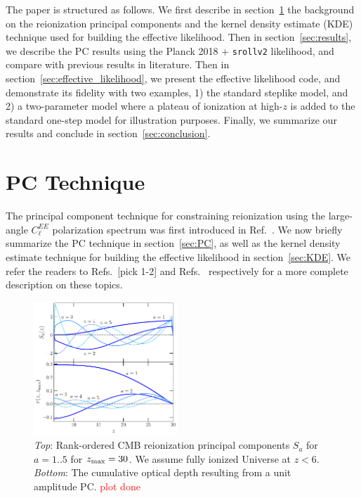 \documentclass[prd,twocolumn,amsmath,amssymb,floatfix,superscriptaddress,nofootinbib]{revtex4-1}
\newcommand{\zmax}{z_{\rm max}}
\newcommand{\ch}[1]{\textcolor{red}{#1}}
\begin{document}
The paper is structured as follows. We first describe in section~\ref{sec:background} the background on the reionization principal components and the kernel density estimate (KDE) technique used for building the effective likelihood. Then in section~\ref{sec:results}, we describe the PC results using the Planck 2018 + \texttt{srollv2} likelihood, and compare with previous results in literature. Then in section~\ref{sec:effective_likelihood}, we present the effective likelihood code, and demonstrate its fidelity with two examples, 1) the standard steplike model, and 2) a two-parameter model where a plateau of ionization at high-$z$ is added to the standard one-step model for illustration purposes. Finally, we summarize our results and conclude in section~\ref{sec:conclusion}.

%
%
%
%
%

\section{PC Technique}
\label{sec:background}
The principal component technique for constraining reionization using the large-angle $C_\ell^{EE}$ polarization spectrum was first introduced in Ref.~\cite{Hu:2003gh}. We now briefly summarize the PC technique in section~\ref{sec:PC}, as well as the kernel density estimate technique for building the effective likelihood in section~\ref{sec:KDE}. We refer the readers to Refs.~\cite{Hu:2003gh, Mortonson:2008rx, Mortonson:2007hq, Heinrich:2018btc}[pick 1-2] and Refs.~\cite{Heinrich:2016ojb} respectively for a more complete description on these topics.

%
%
 \begin{figure}
          \includegraphics[width=0.48\textwidth]{paper/plots/pl18_plot_pub_xe_basis_tau_basis_zmax30_heinrich.pdf}
          \caption{\textit{Top}: Rank-ordered CMB reionization principal components $S_a$ for $a = 1..5$ for $\zmax = 30$. We assume fully ionized Universe at $z < 6$. \textit{Bottom}: The cumulative optical depth resulting from a unit amplitude PC. \ch{plot done}} 
          \label{fig:xe}
\end{figure}
 
\end{document}
